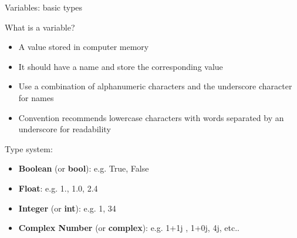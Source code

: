 \documentclass[10pt]{beamer}
\begin{document}
\begin{frame}{Variables: basic types}
\begin{block}{What is a variable?}

\begin{itemize}
	\item A value stored in computer memory
	\item It should have a name and store the corresponding value
	\item Use a combination of alphanumeric characters and the underscore character for names
	\item Convention recommends lowercase characters with words separated by an underscore for readability
\end{itemize}
\end{block}

\begin{block}{Type system:}

\begin{itemize}
	\item \textbf{Boolean} (or \textbf{bool}): e.g.  True, False 
	\item  \textbf{Float}: e.g. 1., 1.0, 2.4
	\item \textbf{Integer} (or \textbf{int}): e.g. 1, 34
	\item \textbf{Complex Number} (or \textbf{complex}): e.g. 1+1j , 1+0j, 4j, etc..
\end{itemize}
\end{block}
\end{frame}
\end{document}
